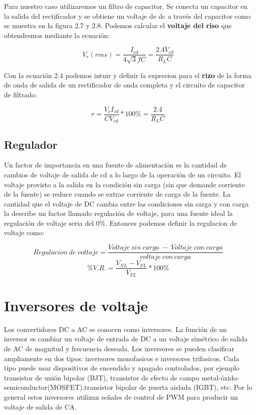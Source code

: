 Para nuestro caso utilizaremos un filtro de capacitor. Se conecta un capacitor en la salida del rectificador y se obtiene un voltaje de dc a través del capacitor como se muestra en la figura 2.7 y 2.8. Podemos calcular el \textbf{voltaje del riso} que obtendremos mediante la ecuación:

\begin{equation}
V_{r}(rms)=\dfrac{I_{cd}}{4\sqrt{3}fC}=\dfrac{2.4V_{cd}}{R_{L}C}
\end{equation}

Con la ecuación 2.4 podemos intuir y definir la expresion para el \textbf{rizo} de la forma de onda de salida de un rectificador de onda completa y el circuito de capacitor de filtrado:

\begin{equation}
r=\dfrac{V_{r}I_{cd}}{CV_{cd}}*100\%=\dfrac{2.4}{R_{L}C}
\end{equation}
\newpage
\subsection{Regulador}

Un factor de importancia en una fuente de alimentación es la cantidad de cambios de voltaje de salida de cd a lo largo de la operación de un circuito. El voltaje provisto a la salida en la condición sin carga (sin que demande corriente de la fuente) se reduce cuando se extrae corriente de carga de la fuente. La cantidad que el voltaje de DC cambia entre las condiciones sin carga y con carga la describe un factor llamado regulación de voltaje, para una fuente ideal la regulación de voltaje seria del 0\%. Entonces podemos definir la regulacion de voltaje como:
 

$$Regulaci\acute{o}n\:de\: voltaje = \dfrac{Voltaje\: sin \:carga \:-\: Voltaje\: con\: carga}{voltaje\: con\: carga}$$
\begin{equation} 
 \%V.R. = \dfrac{V_{NL}-V_{FL}}{V_{FL}}*100\%
\end{equation}





\newpage

\section{Inversores de voltaje}

Los convertidores DC a AC se conocen como inversores. La función de un inversor es cambiar un voltaje de entrada de DC a un voltaje simétrico de salida de AC de magnitud y frecuencia deseada. 
Los inversores se pueden clasificar ampliamente en dos tipos: inversores monofasicos e inversores trifasicos. Cada tipo puede usar dispositivos de encendido y apagado controlados, por ejemplo transistor de unión bipolar (BJT), transistor de efecto de campo metal-óxido-semiconductor(MOSFET),transistor bipolar de puerta aislada (IGBT), etc. Por lo general estos inversores utilizan señales de control de PWM para producir un voltaje de salida de CA.

